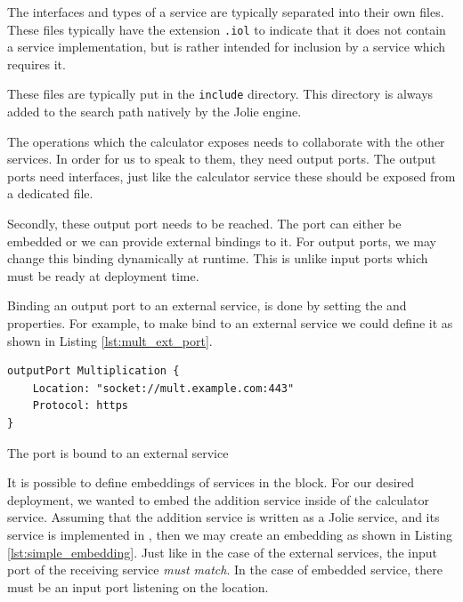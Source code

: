 \begin{observation}

The interfaces and types of a service are typically separated into their own
files. These files typically have the extension \verb!.iol! to indicate that it
does not contain a service implementation, but is rather intended for inclusion
by a service which requires it.

These files are typically put in the \verb!include! directory. This
directory is always added to the search path natively by the Jolie engine.

\end{observation}

The operations which the calculator exposes needs to collaborate with the other
services. In order for us to speak to them, they need output ports.  The output
ports need interfaces, just like the calculator service these should be exposed
from a dedicated file.

Secondly, these output port needs to be reached. The port can either be
embedded or we can provide external bindings to it. For output ports, we may
change this binding dynamically at runtime. This is unlike input ports which
must be ready at deployment time.

Binding an output port to an external service, is done by setting the
 and  properties. For example, to make
 bind to an external service we could define it as shown
in Listing \ref{lst:mult_ext_port}.

\begin{listing}[H]
\begin{verbatim}
outputPort Multiplication {
    Location: "socket://mult.example.com:443"
    Protocol: https
}
\end{verbatim}
\caption{The  port is bound to an external service}
\label{lst:mult_ext_port}
\end{listing}

It is possible to define embeddings of services in the  block.
For our desired deployment, we wanted to embed the addition service inside of
the calculator service. Assuming that the addition service is written as a
Jolie service, and its service is implemented in , then we
may create an embedding as shown in Listing \ref{lst:simple_embedding}. Just
like in the case of the external services, the input port of the receiving
service \emph{must match}. In the case of embedded service, there must be an
input port listening on the  location.

